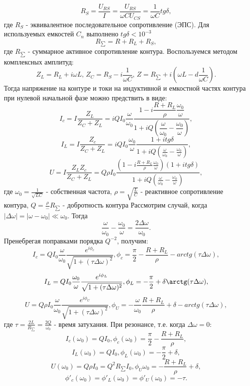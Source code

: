 \documentclass[12pt]{article}
\begin{document}
\[
    R_S=\dfrac{U_{RS}}{I}=\frac{U_{RS}}{\omega CU_{CS}}=\dfrac{1}{\omega C}tg\delta,
\]
где $R_S$ - эквивалентное последовательное сопротивление (ЭПС).
Для используемых емкостей $C_n$ выполнено $tg\delta<10^{-3}$
\[
    R_{\sum}=R+R_L+R_S,
\]
где $R_{\sum}$ - суммарное активное сопротивление контура.
Воспользуемся методом комплексных амплитуд:
\[
    Z_L=R_L+i\omega L, \, Z_C=R_S-i\frac{1}{\omega C}, \, Z=R_{\sum}+i(\omega L-d\dfrac{1}{\omega C}).
\]
Тогда напряжение на контуре и токи на индуктивной и емкостной частях контура при нулевой начальной фазе можно предствить в виде:
\[
    I_c=I\dfrac{Z_L}{Z_C+Z_L}=iQI_0\dfrac{\omega}{\omega_0}\dfrac{1-i\dfrac{R+R_L}{\rho}\dfrac{\omega_0}{\omega}}{1+iQ(\dfrac{\omega}{\omega_0}-\dfrac{\omega_0}{\omega})},
\]
\[
    I_L=I\dfrac{Z_c}{Z_C+Z_L}=iQI_0\frac{\omega_0}{\omega}\frac{1+itg\delta}{1+iQ(\frac{\omega}{\omega_0}-\frac{\omega_0}{\omega})},
\]
\[
    U=I\frac{Z_LZ_c}{Z_C+Z_L}=Q\rho I_0\frac{(1-i\frac{R+R_L}{\rho}\frac{\omega_0}{\omega})(1+itg\delta)}{1+iQ(\frac{\omega}{\omega_0}-\frac{\omega_0}{\omega})},
\]
где $\omega_0=\frac{1}{\sqrt{LC}}$ - собственная частота, $\rho=\sqrt{\frac{L}{C}}$ - реактивное сопротивление контура, $Q=\frac{\rho} - {R_{\sum}}$ - добротность контура\newline
Рассмотрим случай, когда $|\Delta\omega|=|\omega-\omega_0|\ll\omega_0$. 
Тогда
\[
    \frac{\omega}{\omega_0}-\frac{\omega_0}{\omega}=\frac{2\Delta\omega}{\omega_0}.
\]
Пренебрегая поправками порядка $Q^{-2}$, получим:
\[
    I_c=QI_0\frac{\omega}{\omega_0}\frac{e^{i\phi_c}}{\sqrt{1+(\tau\Delta\omega)^2}}, \phi_c=\frac{\pi}{2}-\frac{R+R_L}{\rho}-arctg(\tau\Delta\omega),
\]
\[
    I_L=QI_0\frac{\omega_0}{\omega}\frac{e^{i\phi_L}}{\sqrt{1+(\tau\Delta\omega)^2}}, \phi_L=-\frac{\pi}{2}+\delta\arctg(\tau\Delta\omega),
\]
\[
    U=Q\rho I_0\frac{\omega}{\omega_0}\frac{e^{i\phi_U}}{\sqrt{1+(\tau\Delta\omega)^2}}, \phi_U=-\frac{\omega}{\omega_0}\frac{R+R_L}{\rho}+\delta-arctg(\tau\Delta\omega),
\]
где $\tau=\frac{2L}{R_{\sum}}=\frac{2Q}{\omega_0}$ - время затухания.\newline
При резонансе, т.е. когда $\Delta\omega=0$:
\[
    I_c(\omega_0)=QI_0, \phi_c(\omega_0)=\frac{\pi}{2}-\frac{R+R_L}{\rho},
\]
\[
    I_L(\omega_0)=QI_0, \phi_L(\omega_0)=-\frac{\pi}{2}+\delta,
\]
\[
    U(\omega_0)=Q\rho I_0=Q^2R_{\sum}I_0, \phi_U{\omega_0}=-\frac{R+R_L}{\rho}+\delta,
\]
\[
    \phi'_c(\omega_0)=\phi'_L(\omega_0)=\phi'_U(\omega_0)=-\tau.
\]
\end{document}
